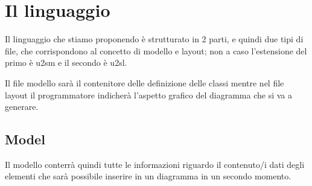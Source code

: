 \chapter{Il linguaggio}

Il linguaggio che stiamo proponendo è strutturato in 2 parti, e quindi due tipi di
file, che corrispondono al concetto di modello e layout; non a caso l'estensione
del primo è u2sm e il secondo è u2sl.

Il file modello sarà il contenitore delle definizione delle classi mentre nel
file layout il programmatore indicherà l'aspetto grafico del diagramma che si va
a generare.

\section{Model}

Il modello conterrà quindi tutte le informazioni riguardo il contenuto/i dati
degli elementi che sarà possibile inserire in un diagramma in un secondo
momento. 


\begin{lstlisting}[caption={Dichiarazione di package}, style={model}]

\end{lstlisting}

